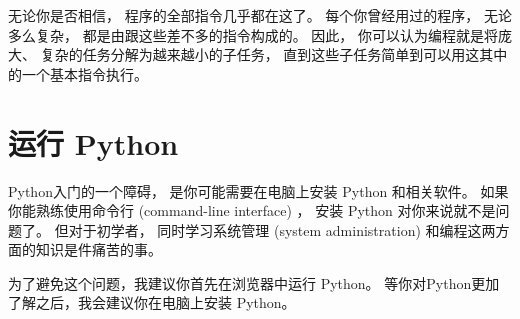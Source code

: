 
无论你是否相信， 程序的全部指令几乎都在这了。  
每个你曾经用过的程序， 无论多么复杂， 都是由跟这些差不多的指令构成的。  
因此， 你可以认为编程就是将庞大、 复杂的任务分解为越来越小的子任务， 直到这些子任务简单到可以用这其中的一个基本指令执行。


\section{运行 Python}


Python入门的一个障碍， 是你可能需要在电脑上安装 Python 和相关软件。  
如果你能熟练使用命令行 (command-line interface) ， 安装 Python 对你来说就不是问题了。  
但对于初学者， 同时学习系统管理 (system administration) 和编程这两方面的知识是件痛苦的事。

  
  


为了避免这个问题，我建议你首先在浏览器中运行 Python。  
等你对Python更加了解之后，我会建议你在电脑上安装 Python。




